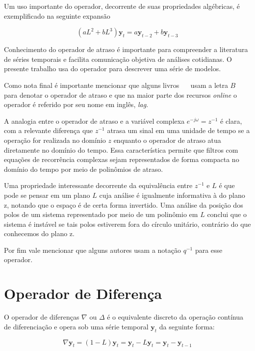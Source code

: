 \vspace{1cm}

Um uso importante do operador, decorrente de suas propriedades algébricas, é
exemplificado na seguinte expansão

$$ (aL^2 + bL^3) \mathbf{y}_{t} =  a\mathbf{y}_{t-2} + b\mathbf{y}_{t-3}$$

Conhecimento do operador de atraso é importante para compreender a literatura
de séries temporais e facilita comunicação objetiva de análises cotidianas.
O presente trabalho usa do operador para descrever uma série de modelos.

Como nota final é importante mencionar que alguns livros~\cite{chatfield}
~\cite{stoffer} usam a letra $B$ para denotar o operador de atraso e que na
maior parte dos recursos \emph{online} o operador é referido por seu nome em
inglês, \emph{lag}.

A analogia entre o operador de atraso e a variável complexa $e^{-j\omega} = z^{-1}$
é clara, com a relevante diferença que $z^{-1}$ atrasa um sinal em uma unidade
de tempo se a operação for realizada no domínio $z$ enquanto o operador de
atraso atua diretamente no domínio do tempo. Essa característica permite que
filtros com equações de recorrência complexas sejam representados de forma
compacta no domínio do tempo por meio de polinômios de atraso.

Uma propriedade interessante decorrente da equivalência entre $z^{-1}$ e $L$ é
que pode se pensar em um plano $L$ cuja análise é igualmente informativa à do
plano z, notando que o espaço é de certa forma invertido. Uma análise da
posição dos polos de um sistema representado por meio de um polinômio em $L$
conclui que o sistema é instável se tais polos estiverem fora do círculo unitário,
contrário do que conhecemos do plano z.

Por fim vale mencionar que alguns autores\cite{aguirre} usam a notação $q^{-1}$
para esse operador.

\section{Operador de Diferença}\label{sec:diff}

O operador de diferenças $\nabla$ ou  $\Delta$ é o equivalente discreto da
operação contínua de diferenciação e opera sob uma série temporal
$\mathbf{y}_t$ da seguinte forma:

$$ \nabla \mathbf{y}_t = (1 - L)\mathbf{y}_t = \mathbf{y}_t - L\mathbf{y}_t = \mathbf{y}_t - \mathbf{y}_{t-1} $$

